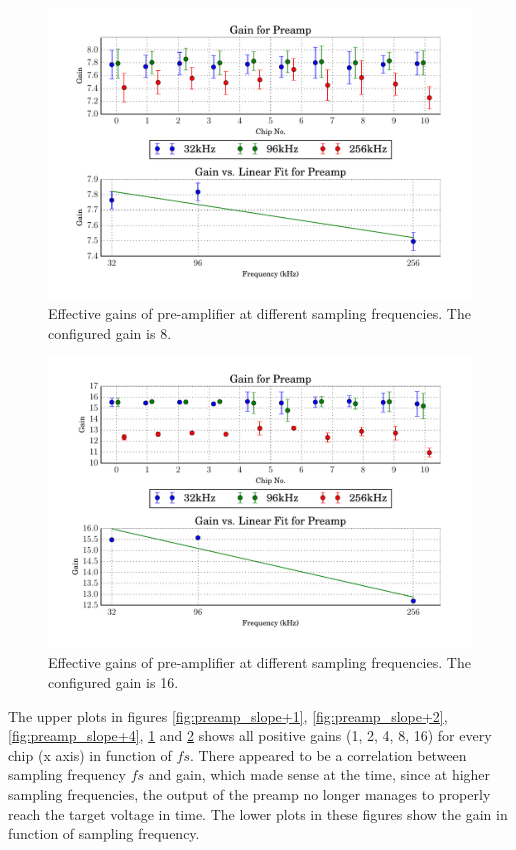 \begin{figure}
    \centering
    \includegraphics[width=.7\linewidth]{images/plots/dc_slope_preamp_gain+8.pdf}
    \caption{Effective gains of pre-amplifier at different sampling frequencies. The configured gain is 8.}
    \label{fig:preamp_slope+8}
\end{figure}
\begin{figure}
    \centering
    \includegraphics[width=.7\linewidth]{images/plots/dc_slope_preamp_gain+16.pdf}
    \caption{Effective gains of pre-amplifier at different sampling frequencies. The configured gain is 16.}
    \label{fig:preamp_slope+16}
\end{figure}

The upper plots in figures \ref{fig:preamp_slope+1}, \ref{fig:preamp_slope+2},
\ref{fig:preamp_slope+4},             \ref{fig:preamp_slope+8}             and
\ref{fig:preamp_slope+16} shows all positive  gains (1, 2, 4, 8, 16) for every
chip (x axis)  in function of $fs$. There appeared to be a correlation between
sampling frequency $fs$  and  gain,  which  made  sense  at the time, since at
higher sampling  frequencies,  the  output  of the preamp no longer manages to
properly reach the  target  voltage  in time. The lower plots in these figures
show the gain in function of sampling frequency.

